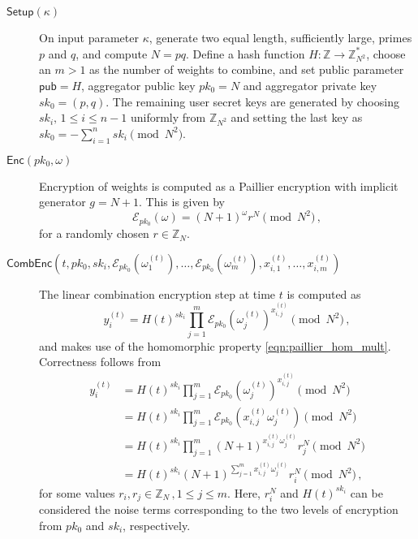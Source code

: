 \documentclass[twocolumn]{autart}
\theoremstyle{definition}
\theoremstyle{remark}
\begin{document}
\begin{description}
    \item[$\mathsf{Setup}(\kappa)$] On input parameter $\kappa$, generate two equal length, sufficiently large, primes $p$ and $q$, and compute $N=pq$. Define a hash function $H:\mathbb{Z} \rightarrow \mathbb{Z}_{N^2}^*$, choose an $m>1$ as the number of weights to combine, and set public parameter $\mathsf{pub}=H$, aggregator public key $pk_0 = N$ and aggregator private key $sk_0=(p,q)$. The remaining user secret keys are generated by choosing $sk_i,\,1\leq i\leq n-1$ uniformly from $\mathbb{Z}_{N^2}$ and setting the last key as $sk_0 = -\sum^{n}_{i=1}sk_i \pmod{N^2}$.
 
    \item[$\mathsf{Enc}(pk_0, \omega)$] Encryption of weights is computed as a Paillier encryption with implicit generator $g=N+1$. This is given by
    \begin{equation}
        \mathcal{E}_{pk_0}(\omega) = (N+1)^{\omega}r^N \pmod{N^2}\,,
    \end{equation}
    for a randomly chosen $r \in \mathbb{Z}_N$.

    \item[$\mathsf{CombEnc}(t, pk_0, sk_i, \mathcal{E}_{pk_0}(\omega_1^{(t)}),\dots,\mathcal{E}_{pk_0}(\omega_m^{(t)}), x^{(t)}_{i,1},\dots,x^{(t)}_{i,m})$] The linear combination encryption step at time $t$ is computed as 
    \begin{equation}
        y^{(t)}_i = H(t)^{sk_i}\prod^{m}_{j=1}\mathcal{E}_{pk_0}(\omega^{(t)}_j)^{x^{(t)}_{i,j}} \pmod{N^2}\,,
    \end{equation}
    and makes use of the homomorphic property \eqref{eqn:paillier_hom_mult}. Correctness follows from
    \begin{equation*}
        \begin{split}
             y^{(t)}_i &= H(t)^{sk_i}\prod^{m}_{j=1}\mathcal{E}_{pk_0}(\omega^{(t)}_j)^{x^{(t)}_{i,j}} \pmod{N^2} \\
            &= H(t)^{sk_i}\prod^{m}_{j=1}\mathcal{E}_{pk_0}(x^{(t)}_{i,j}\omega^{(t)}_j) \pmod{N^2} \\
            &= H(t)^{sk_i}\prod^{m}_{j=1}(N+1)^{x^{(t)}_{i,j}\omega^{(t)}_j} r^{N}_{j} \pmod{N^2} \\
            &= H(t)^{sk_i}(N+1)^{\sum^{m}_{j=1}x^{(t)}_{i,j}\omega^{(t)}_j} r_{i}^{N} \pmod{N^2}\,,
        \end{split}
    \end{equation*}
    for some values $r_i,r_j \in \mathbb{Z}_N\,,1\leq j \leq m$. Here, $r_i^N$ and $H(t)^{sk_i}$ can be considered the noise terms corresponding to the two levels of encryption from $pk_0$ and $sk_i$, respectively.


\end{description}
\end{document}

